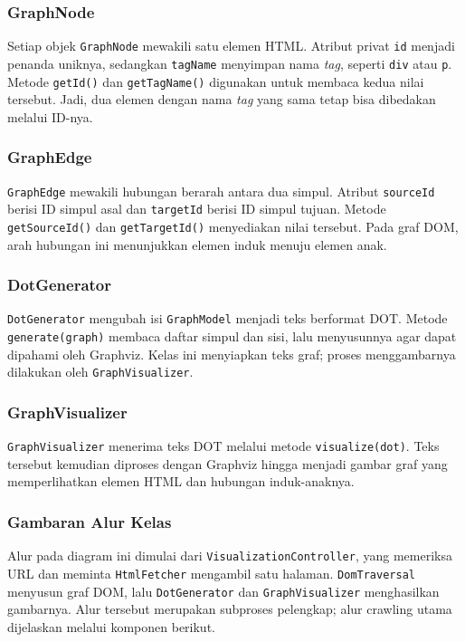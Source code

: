 \subsubsection{GraphNode}
Setiap objek \texttt{GraphNode} mewakili satu elemen HTML. Atribut privat \texttt{id} menjadi penanda uniknya, sedangkan \texttt{tagName} menyimpan nama \textit{tag}, seperti \texttt{div} atau \texttt{p}. Metode \texttt{getId()} dan \texttt{getTagName()} digunakan untuk membaca kedua nilai tersebut. Jadi, dua elemen dengan nama \textit{tag} yang sama tetap bisa dibedakan melalui ID-nya.

\subsubsection{GraphEdge}
\texttt{GraphEdge} mewakili hubungan berarah antara dua simpul. Atribut \texttt{sourceId} berisi ID simpul asal dan \texttt{targetId} berisi ID simpul tujuan. Metode \texttt{getSourceId()} dan \texttt{getTargetId()} menyediakan nilai tersebut. Pada graf DOM, arah hubungan ini menunjukkan elemen induk menuju elemen anak.

\subsubsection{DotGenerator}
\texttt{DotGenerator} mengubah isi \texttt{GraphModel} menjadi teks berformat DOT. Metode \texttt{generate(graph)} membaca daftar simpul dan sisi, lalu menyusunnya agar dapat dipahami oleh Graphviz. Kelas ini menyiapkan teks graf; proses menggambarnya dilakukan oleh \texttt{GraphVisualizer}.

\subsubsection{GraphVisualizer}
\texttt{GraphVisualizer} menerima teks DOT melalui metode \texttt{visualize(dot)}. Teks tersebut kemudian diproses dengan Graphviz hingga menjadi gambar graf yang memperlihatkan elemen HTML dan hubungan induk-anaknya.

\subsubsection{Gambaran Alur Kelas}
Alur pada diagram ini dimulai dari \texttt{VisualizationController}, yang memeriksa URL dan meminta \texttt{HtmlFetcher} mengambil satu halaman. \texttt{DomTraversal} menyusun graf DOM, lalu \texttt{DotGenerator} dan \texttt{GraphVisualizer} menghasilkan gambarnya. Alur tersebut merupakan subproses pelengkap; alur crawling utama dijelaskan melalui komponen berikut.

